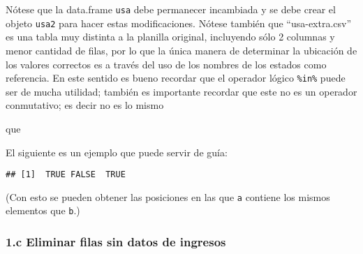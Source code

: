 \documentclass[]{article}
\newenvironment{Shaded}{}{}
\newcommand{\KeywordTok}[1]{\textcolor[rgb]{0.00,0.44,0.13}{\textbf{{#1}}}}
\newcommand{\StringTok}[1]{\textcolor[rgb]{0.25,0.44,0.63}{{#1}}}
\newcommand{\NormalTok}[1]{{#1}}
\begin{document}
Nótese que la data.frame \texttt{usa} debe permanecer incambiada y se
debe crear el objeto \texttt{usa2} para hacer estas modificaciones.
Nótese también que ``usa-extra.csv'' es una tabla muy distinta a la
planilla original, incluyendo sólo 2 columnas y menor cantidad de filas,
por lo que la única manera de determinar la ubicación de los valores
correctos es a través del uso de los nombres de los estados como
referencia. En este sentido es bueno recordar que el operador lógico
\texttt{\%in\%} puede ser de mucha utilidad; también es importante
recordar que este no es un operador conmutativo; es decir no es lo mismo

\begin{Shaded}
\end{Shaded}

que

\begin{Shaded}
\end{Shaded}

El siguiente es un ejemplo que puede servir de guía:

\begin{Shaded}
\end{Shaded}

\begin{verbatim}
## [1]  TRUE FALSE  TRUE
\end{verbatim}

(Con esto se pueden obtener las posiciones en las que \texttt{a}
contiene los mismos elementos que \texttt{b}.)

\subsubsection{1.c Eliminar filas sin datos de ingresos}
\end{document}
